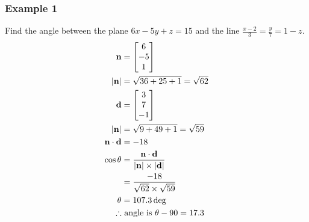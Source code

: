 \documentclass[class=article, crop=false]{standalone}
\begin{document}
\subsubsection*{Example 1}
Find the angle between the plane $6x -5y + z = 15$ and the line $\frac{x-2}{3} = \frac{y}{7} = 1-z$.
\begin{align*}
\bold{n} & = \begin{bmatrix} 6 \\ -5 \\ 1 \\ \end{bmatrix} \\
|\bold{n}| & = \sqrt{36 + 25 + 1} = \sqrt{62} \\
\bold{d} & = \begin{bmatrix} 3 \\ 7 \\ -1 \\ \end{bmatrix} \\
|\bold{n}| & = \sqrt{9 + 49 + 1} = \sqrt{59} \\
\bold{n} \cdot \bold{d} & = -18 \\
\cos \theta & = \frac{\bold{n} \cdot \bold{d}}{|\bold{n}| \times |\bold{d}|} \\
& = \frac{-18}{\sqrt{62} \times \sqrt{59}} \\
\theta & = 107.3 \deg \\
\therefore & \text{ angle is } \theta - 90 = 17.3 \\
\end{align*}
\end{document}
